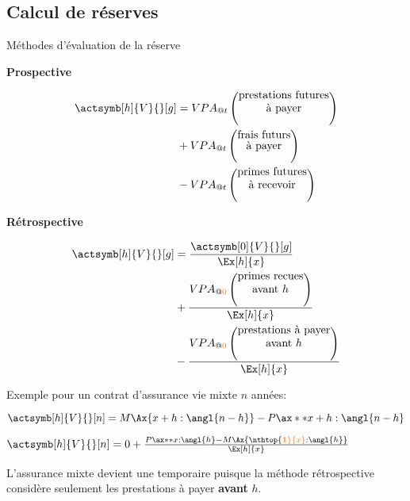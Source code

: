 \documentclass[10pt, french]{article}
\begin{document}
\begin{multicols*}{2}
\subsection*{Calcul de réserves}
\begin{conceptgen}{Méthodes d'évaluation de la réserve}
\setlength{\mathindent}{-1.5cm}
\begin{minipage}[t]{0.5\columnwidth}
\begin{center}
	\textbf{Prospective}
\end{center}
\begin{align*}
	\actsymb[h]{V}{}[g]
	&=	VPA_{@t}\left(\shortstack{prestations futures\\ à payer}\right)\\	 
		&+	VPA_{@t}\left(\shortstack{frais futurs\\ à payer}\right)\\ 
		&- 	VPA_{@t}\left(\shortstack{primes futures\\ à recevoir}\right)
\end{align*}
\end{minipage}
\setlength{\mathindent}{-0.5cm}
\begin{minipage}[t]{0.5\columnwidth}
\begin{center}
	\textbf{Rétrospective}
\end{center}
\begin{align*}
	\actsymb[h]{V}{}[g]
	&=	\frac{\actsymb[0]{V}{}[g]}{\Ex[h]{x}}	\\
		&+ 	\frac{VPA_{@\textcolor{orange}{0}}\left(\shortstack{primes recues\\ avant $h$}\right)}{\Ex[h]{x}}	\\
		&- 	\frac{VPA_{@\textcolor{orange}{0}}\left(\shortstack{prestations à payer\\ avant $h$}\right)}{\Ex[h]{x}}
\end{align*}
\end{minipage}
\setlength{\mathindent}{1cm}

\tcbline

Exemple pour un contrat d'assurance vie mixte $n$ années:
\begin{description}
	\item[Méthode prospective]	$\actsymb[h]{V}{}[n]	=	M \Ax{x + h: \angl{n - h}} - P \ax**{x + h: \angl{n - h}}$
	\item[Méthode rétrospective]	$\actsymb[h]{V}{}[n]	=	0 + \frac{P \ax**{x:\angl{h}} - M\Ax{\nthtop{\color{orange}\textbf{1}}{x}:\angl{h}}}{\Ex[h]{x}}$
	\item	L'assurance mixte devient une temporaire puisque la méthode rétrospective considère seulement les prestations à payer {\color{orange}\textbf{avant}} $h$.
\end{description}


\end{conceptgen}
\end{multicols*}
\end{document}

